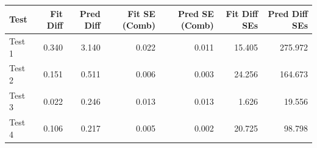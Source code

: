
\begin{tabular}{l|r|r|r|r|r|r}
\hline
Test & Fit Diff & Pred Diff & Fit SE (Comb) & Pred SE (Comb) & Fit Diff SEs & Pred Diff SEs\\
\hline
Test 1 & 0.340 & 3.140 & 0.022 & 0.011 & 15.405 & 275.972\\
\hline
Test 2 & 0.151 & 0.511 & 0.006 & 0.003 & 24.256 & 164.673\\
\hline
Test 3 & 0.022 & 0.246 & 0.013 & 0.013 & 1.626 & 19.556\\
\hline
Test 4 & 0.106 & 0.217 & 0.005 & 0.002 & 20.725 & 98.798\\
\hline
\end{tabular}
